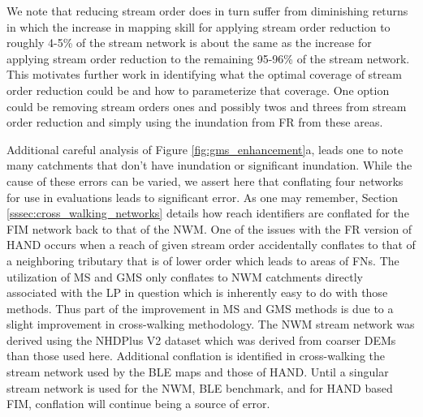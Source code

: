 \documentclass[draft]{dependencies/agujournal2019}
\begin{document}
We note that reducing stream order does in turn suffer from diminishing returns in which the increase in mapping skill for applying stream order reduction to roughly 4-5\% of the stream network is about the same as the increase for applying stream order reduction to the remaining 95-96\% of the stream network.
This motivates further work in identifying what the optimal coverage of stream order reduction could be and how to parameterize that coverage. 
One option could be removing stream orders ones and possibly twos and threes from stream order reduction and simply using the inundation from FR from these areas.

Additional careful analysis of Figure \ref{fig:gms_enhancement}a, leads one to note many catchments that don't have inundation or significant inundation.
While the cause of these errors can be varied, we assert here that conflating four networks for use in evaluations leads to significant error.
As one may remember, Section \ref{sssec:cross_walking_networks} details how reach identifiers are conflated for the FIM network back to that of the NWM. 
One of the issues with the FR version of HAND occurs when a reach of given stream order accidentally conflates to that of a neighboring tributary that is of lower order which leads to areas of FNs.
The utilization of MS and GMS only conflates to NWM catchments directly associated with the LP in question which is inherently easy to do with those methods. 
Thus part of the improvement in MS and GMS methods is due to a slight improvement in cross-walking methodology.
The NWM stream network was derived using the NHDPlus V2 dataset which was derived from coarser DEMs than those used here. 
Additional conflation is identified in cross-walking the stream network used by the BLE maps and those of HAND.
Until a singular stream network is used for the NWM, BLE benchmark, and for HAND based FIM, conflation will continue being a source of error.
\end{document}
